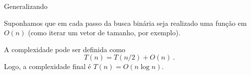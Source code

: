 \begin{frame}{Generalizando}

    Suponhamos que em cada passo da busca binária seja realizado uma função em $O(n)$ (como iterar um vetor de tamanho, por exemplo).

    A complexidade pode ser definida como $$T(n) = T(n/2) + O(n) \ .$$
    Logo, a complexidade final é $T(n) = O(n \log n)$.
    

\end{frame}

